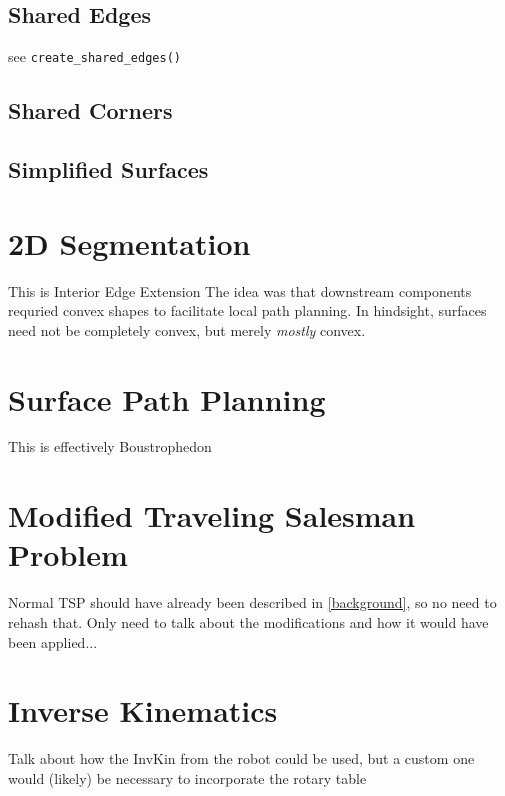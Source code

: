 \subsection{Shared Edges}
see \verb|create_shared_edges()|

\subsection{Shared Corners}

\subsection{Simplified Surfaces}

\section{2D Segmentation}
This is Interior Edge Extension
The idea was that downstream components requried convex shapes to facilitate local path planning.
In hindsight, surfaces need not be completely convex, but merely \textit{mostly} convex.

\section{Surface Path Planning}
This is effectively Boustrophedon

\section{Modified Traveling Salesman Problem}
Normal TSP should have already been described in \ref{background}, so no need to rehash that.
Only need to talk about the modifications and how it would have been applied...

\section{Inverse Kinematics}
Talk about how the InvKin from the robot could be used, but a custom one would (likely) be necessary to incorporate the rotary table

